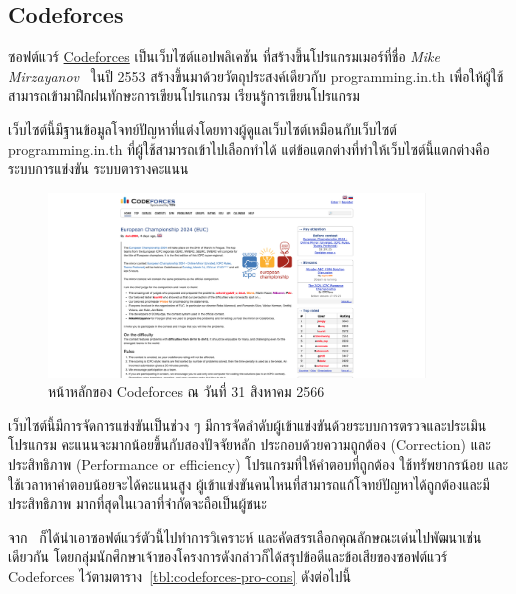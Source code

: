 \documentclass[12pt,one side,openright,a4paper]{cpe-thesis-th}
\newcommand{\thaijustify}[1]{%
  \par\hspace{30pt}\justifying
  #1
}
\begin{document}
    \subsection{Codeforces}
        \thaijustify{
            ซอฟต์แวร์ \href{https://codeforces.com}{Codeforces} เป็นเว็บไซต์แอปพลิเคชัน ที่สร้างขึ้นโปรแกรมเมอร์ที่ชื่อ \textit{Mike Mirzayanov}~\cite{codeforces} ในปี 2553 สร้างขึ้นมาด้วยวัตถุประสงค์เดียวกับ programming.in.th เพื่อให้ผู้ใช้สามารถเข้ามาฝึกฝนทักษะการเขียนโปรแกรม เรียนรู้การเขียนโปรแกรม 
        }
        \thaijustify{
            เว็บไซต์นี้มีฐานข้อมูลโจทย์ปัญหาที่แต่งโดยทางผู้ดูแลเว็บไซต์เหมือนกับเว็บไซต์ programming.in.th ที่ผู้ใช้สามารถเข้าไปเลือกทำได้ แต่ข้อแตกต่างที่ทำให้เว็บไซต์นี้แตกต่างคือระบบการแข่งขัน ระบบตารางคะแนน
        }
        \begin{figure}[H]
            \centering
            \includegraphics[width=10cm]{figure/literature/codeforces.png}
            \caption[หน้าหลักของ Codeforces]{หน้าหลักของ Codeforces ณ วันที่ 31 สิงหาคม 2566~\cite{codeforces}}\label{fig:codeforces-page}
        \end{figure}
        \thaijustify{
            เว็บไซต์นี้มีการจัดการแข่งขันเป็นช่วง ๆ มีการจัดลำดับผู้เข้าแข่งขันด้วยระบบการตรวจและประเมินโปรแกรม คะแนนจะมากน้อยขึ้นกับสองปัจจัยหลัก ประกอบด้วยความถูกต้อง (Correction) และประสิทธิภาพ (Performance or efficiency) โปรแกรมที่ให้คำตอบที่ถูกต้อง ใช้ทรัพยากรน้อย และใช้เวลาหาคำตอบน้อยจะได้คะแนนสูง ผู้เข้าแข่งขันคนไหนที่สามารถแก้โจทย์ปัญหาได้ถูกต้องและมีประสิทธิภาพ มากที่สุดในเวลาที่จำกัดจะถือเป็นผู้ชนะ
        }
        \thaijustify{
            จาก~\cite{nattawat20pgs} ก็ได้นำเอาซอฟต์แวร์ตัวนี้ไปทำการวิเคราะห์ และคัดสรรเลือกคุณลักษณะเด่นไปพัฒนาเช่นเดียวกัน โดยกลุ่มนักศึกษาเจ้าของโครงการดังกล่าวก็ได้สรุปข้อดีและข้อเสียของซอฟต์แวร์ Codeforces ไว้ตามตาราง~\ref{tbl:codeforces-pro-cons} ดังต่อไปนี้
        }
\end{document}
